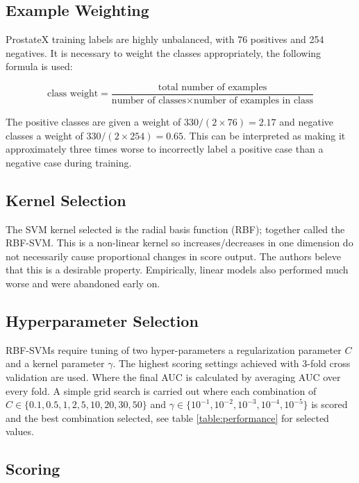 \documentclass[a4paper]{spie}
\begin{document}
\subsection{Example Weighting}

ProstateX training labels are highly unbalanced, with 76 positives and 254 negatives. It is necessary to weight the classes appropriately\cite{Yang2009}, the following formula is used:

\begin{equation}
\text{class weight} =
\frac
    {\text{total number of examples}}
    {\text{number of classes} \times \text{number of examples in class}}
\end{equation}
    
The positive classes are given a weight of $ 330 / (2 \times 76) =  2.17 $ and negative classes a weight of $ 330 / (2 \times 254) = 0.65 $. This can be interpreted as making it approximately three times worse to incorrectly label a positive case than a negative case during training.

\subsection{Kernel Selection}

The SVM kernel selected is the radial basis function (RBF); together called the RBF-SVM. This is a non-linear kernel so increases/decreases in one dimension do not necessarily cause proportional changes in score output. The authors beleve that this is a desirable property. Empirically, linear models also performed much worse and were abandoned early on.

\subsection{Hyperparameter Selection}

RBF-SVMs require tuning of two hyper-parameters a regularization parameter $C$ and a kernel parameter $\gamma$. The highest scoring settings achieved with 3-fold cross validation\cite{Hastie2009} are used. Where the final AUC is calculated by averaging AUC over every fold. A simple grid search is carried out where each combination of $C \in \{0.1, 0.5, 1, 2, 5, 10, 20, 30, 50\}$ and $\gamma \in \{10^{-1}, 10^{-2}, 10^{-3}, 10^{-4}, 10^{-5}\}$ is scored and the best combination selected, see table \ref{table:performance} for selected values.

\subsection{Scoring}
\end{document}
